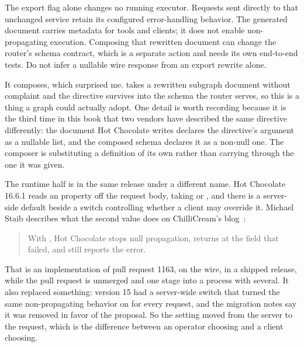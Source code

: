 %
The export flag alone changes no running executor. Requests sent directly
to that unchanged service retain its configured error-handling behavior.
The generated document carries metadata for tools and clients; it does not
enable non-propagating execution. Composing that rewritten document can
change the router's schema contract, which is a separate action and needs its
own end-to-end tests. Do not infer a nullable wire response from an export
rewrite alone.

%
It composes, which surprised me.  takes a rewritten subgraph document
without complaint and the directive survives into the schema the router serves,
so this is a thing a graph could actually adopt. One detail is worth recording
because it is the third time in this book that two vendors have described the
same directive differently: the document Hot Chocolate writes declares the
directive's argument as a nullable list, and the composed schema declares it as
a non-null one. The composer is substituting a definition of its own rather than
carrying through the one it was given.

%
The runtime half is in the same release under a different name. Hot Chocolate
16.6.1 reads an  property off the request body, taking
 or , and there is a server-side default beside a
switch controlling whether a client may override it. Michael Staib describes
what the second value does on ChilliCream's blog~\autocite{staib2026hc16}:

\begin{quote}
With , Hot Chocolate stops null propagation, returns
 at the field that failed, and still reports the error.
\end{quote}

%
That is an implementation of pull request 1163, on the wire, in a shipped
release, while the pull request is unmerged and one stage into a process with
several. It also replaced something: version 15 had a server-wide switch that
turned the same non-propagating behavior on for every request, and the
migration notes say it was removed in favor of the proposal. So the setting
moved from the server to the request, which is the difference between an
operator choosing and a client choosing.


